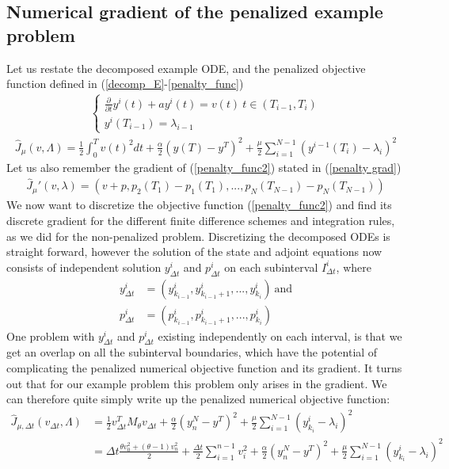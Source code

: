 \subsection{Numerical gradient of the penalized example problem}
Let us restate the decomposed example ODE, and the penalized objective function defined in (\ref{decomp_E}-\ref{penalty_func})
\begin{align}
\left\{
     \begin{array}{lr}
       	\frac{\partial}{\partial t} y^i(t)+a y^i(t) = v(t) \ t\in(T_{i-1},T_{i})\\
       	y^i(T_{i-1})=\lambda_{i-1}
     \end{array}
   \right. \label{decomp_E2}
\end{align}
\begin{align}
\hat J_{\mu}(v,\Lambda) = \frac{1}{2}\int_0^Tv(t)^2dt + \frac{\alpha}{2}(y(T)-y^T)^2 + \frac{\mu}{2}\sum_{i=1}^{N-1}(y^{i-1}(T_i)-\lambda_i)^2 \label{penalty_func2}
\end{align}
Let us also remember the gradient of (\ref{penalty_func2}) stated in (\ref{penalty grad})
\begin{align}
\hat J_{\mu}'(v,\lambda) = (v+p,p_{2}(T_1) -p_{1}(T_1),..., p_{N}(T_{N-1}) -p_{N}(T_{N-1})) \label{penalty grad2}
\end{align}
We now want to discretize the objective function (\ref{penalty_func2}) and find its discrete gradient for the different finite difference schemes and integration rules, as we did for the non-penalized problem. Discretizing the decomposed ODEs is straight forward, however the solution of the state and adjoint equations now consists of independent solution $y_{\Delta t}^i$ and $p_{\Delta t}^i$ on each subinterval $I_{\Delta t}^i$, where 
\begin{align*}
y_{\Delta t}^i &= (y_{k_{i-1}}^i,y_{k_{i-1}+1}^i,...,y_{k_{i}}^i) \ \text{and} \\
p_{\Delta t}^i &= (p_{k_{i-1}}^i,p_{k_{i-1}+1}^i,...,p_{k_{i}}^i)
\end{align*} 
One problem with $y_{\Delta t}^i$ and $p_{\Delta t}^i$ existing independently on each interval, is that we get an overlap on all the subinterval boundaries, which have the potential of complicating the penalized numerical objective function and its gradient. It turns out that for our example problem this problem only arises in the gradient. We can therefore quite simply write up the penalized numerical objective function:
\begin{align}
\hat J_{\mu,\Delta t}(v_{\Delta t},\Lambda)&=\frac{1}{2} v_{\Delta t}^TM_{\theta}v_{\Delta t}+ \frac{\alpha}{2}(y_n^{N}-y^T)^2 +\frac{\mu }{2}\sum_{i=1}^{N-1} (y_{k_i}^{i}-\lambda_i)^2\\
&=\Delta t\frac{\theta v_0^2+(\theta-1)v_n^2}{2} + \frac{\Delta t}{2}\sum_{i=1}^{n-1} v_i^2 + \frac{\alpha}{2}(y_n^N-y^T)^2+\frac{\mu }{2}\sum_{i=1}^{N-1} (y_{k_i}^{i}-\lambda_i)^2 \label{pen disc f}
\end{align}
